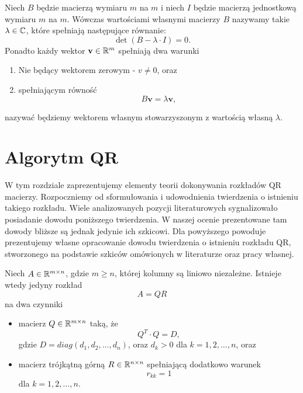\documentclass[10pt,a4paper]{report}
\newcommand{\vr}[1]{\mathbf{#1}}
\newcommand{\mx}[1]{{#1}}
\begin{document}
\begin{definition}
Niech $B$ będzie macierzą wymiaru $m$ na $m$ i niech $I$ będzie macierzą jednostkową wymiaru $m$ na $m$. Wówczas wartościami własnymi macierzy $B$ nazywamy takie $\lambda \in \mathbb{C}$, które spełniają następujące równanie:
$$
\det (\mx{B}-\lambda\cdot \mx{I})=0. 
$$ 
Ponadto każdy wektor $\vr{v} \in \setR^m$ spełniają dwa warunki
\begin{enumerate}
\item Nie będący wektorem zerowym - $v \neq 0$, oraz
\item spełniającym równość
$$
\mx{B} \vr{v} = \lambda \vr{v},
$$
\end{enumerate}
nazywać będziemy wektorem własnym stowarzyszonym z wartością własną $\lambda$.
\end{definition}

\chapter{Algorytm QR}

W tym rozdziale zaprezentujemy elementy teorii dokonywania rozkładów QR macierzy. Rozpoczniemy od sformułowania i udowodnienia twierdzenia o istnieniu takiego rozkładu. Wiele analizowanych pozycji literaturowych sygnalizowało posiadanie dowodu poniższego twierdzenia. W naszej ocenie prezentowane tam dowody bliższe są jednak jedynie ich szkicowi. Dla powyższego powoduje prezentujemy własne opracowanie dowodu twierdzenia o istnieniu rozkładu QR, stworzonego na podstawie szkiców omówionych w literaturze oraz pracy własnej. 

\begin{theorem}[O rozkładzie QR]\label{theorem-qr-docomposition}
Niech $\mx{A} \in \setR^{m \times n}$, gdzie $m\ge n$, której kolumny są liniowo niezależne. Istnieje wtedy jedyny rozkład 
$$
\mx{A} = \mx{Q} \mx{R}
$$ 
na dwa czynniki
\begin{itemize}
\item macierz $\mx{Q} \in \setR^{m \times n} $ taką, że 
$$
Q^{T}\cdot Q=D,
$$
gdzie $D= diag (d_{1}, d_{2}, ..., d_{n})$, oraz $d_{k}>0$ dla $k = 1, 2, \ldots, n$, oraz
\item macierz trójkątną górną $\mx{R} \in \setR^{n \times n}$ spełniającą dodatkowo warunek 
$$
r_{kk}= 1 
$$ 
dla $k = 1, 2, \ldots, n$.
\end{itemize} 
\end{theorem}

\end{document}
